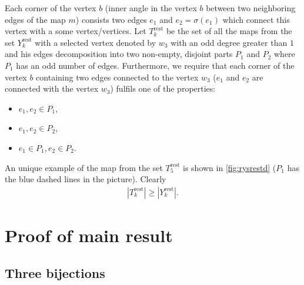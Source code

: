 \documentclass[submission]{FPSAC2021}
\DeclareMathOperator{\rest}{rest}
\newcommand{\nast}{\sigma}
\begin{document}
Each corner of the vertex $b$ (inner angle in the vertex $b$ between 
two neighboring edges of the map $m$) consists two edges $e_1$ and $e_2=\nast(e_1)$
which connect this vertex with a some vertex/vertices. Let $T_k^{\rest}$
be the set of all the maps from the set $Y_k^{\rest}$ with a selected vertex
denoted by $w_3$ with an odd degree greater than $1$ and his edges decomposition into
two non-empty, disjoint parts $P_1$ and $P_2$ where $P_1$ has an odd
number of edges. Furthermore, we require that each corner 
of the vertex $b$ containing two edges connected to the vertex $w_3$ 
($e_1$ and $e_2$ are connected with the vertex $w_3$)
fulfils one of the properties:
\begin{itemize}
\item $e_1, e_2 \in P_1$,
\item $e_1, e_2 \in P_2$, 
\item $e_1 \in P_1, e_2 \in P_2$. 
\end{itemize}  
An unique example of the map from the set $T_{5}^{\rest}$ is shown in
\cref{fig:rysrestd} ($P_1$ has the blue dashed lines in the picture).
Clearly
\begin{align}
\label{ineqrest}
|T_{k}^{\rest}| \geq |Y_{k}^{\rest}|.
\end{align}

\pagebreak[1] 

\section{Proof of main result}
\subsection{Three bijections}
\end{document}
